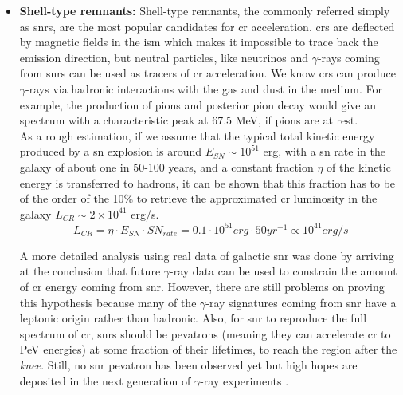 \documentclass[main.tex]{subfiles}
\begin{document}
\begin{itemize}
    \item \textbf{Shell-type remnants:} Shell-type remnants, the commonly referred simply as \glspl{snr}, are the most popular candidates for \gls{cr} acceleration. \glspl{cr} are deflected by magnetic fields in the \gls{ism} which makes it impossible to trace back the emission direction, but neutral particles, like neutrinos and $\gamma$-rays coming from \glspl{snr} can be used as tracers of \gls{cr} acceleration.
    We know \glspl{cr} can produce $\gamma$-rays via hadronic interactions with the gas and dust in the medium. For example, the production of pions and posterior pion decay would give an spectrum with a characteristic peak at 67.5 MeV, if pions are at rest. \\
    As a rough estimation, if we assume that the typical total kinetic energy produced by a \gls{sn} explosion is around $E_{SN} \sim 10^{51}$ erg, with a \gls{sn} rate in the galaxy of about one in 50-100 years, and a constant fraction $\eta$ of the kinetic energy is transferred to hadrons, it can be shown that this fraction has to be of the order of the 10\% to retrieve the approximated \gls{cr} luminosity in the galaxy $L_{CR} \sim 2 \times 10^{41}$ erg/s.
    \begin{equation}
        L_{CR} = \eta \cdot E_{SN} \cdot SN_{rate} = 0.1 \cdot 10^{51} erg \cdot 50 yr^{-1} \propto 10^{41} erg/s
    \end{equation}
    
    A more detailed analysis using real data of galactic \gls{snr} was done by \cite{2016originCR} arriving at the conclusion that future $\gamma$-ray data can be used to constrain the amount of \gls{cr} energy coming from \gls{snr}. However, there are still problems on proving this hypothesis because many of the $\gamma$-ray signatures coming from \gls{snr} have a leptonic origin rather than hadronic. Also, for \gls{snr} to reproduce the full spectrum of \gls{cr}, \glspl{snr} should be pevatrons (meaning they can accelerate \gls{cr} to PeV energies) at some fraction of their lifetimes, to reach the region after the \textit{knee}. Still, no \gls{snr} pevatron has been observed yet but high hopes are deposited in the next generation of $\gamma$-ray experiments \cite{2018SNRPevatrons}.
    

\end{itemize}
\end{document}
